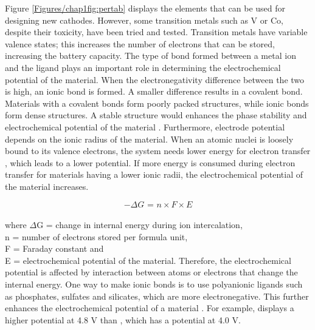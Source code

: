 Figure \ref{Figures/chap1fig:pertab} displays the elements that can be used for designing new cathodes. However, some transition metals such as V or Co, despite their toxicity, have been tried and tested. Transition metals have variable valence states; this increases the number of electrons that can be stored, increasing the battery capacity. The type of bond formed between a metal ion and the ligand plays an important role in determining the electrochemical potential of the material. When the electronegativity difference between the two is high, an ionic bond is formed. A smaller difference results in a covalent bond. Materials with a covalent bonds form poorly packed structures, while ionic bonds form dense structures. A stable structure would enhances the phase stability and electrochemical potential of the material \cite{melot_design_2013}. Furthermore, electrode potential depends on the ionic radius of the material. When an atomic nuclei is loosely bound to its valence electrons, the system needs lower energy for electron transfer , which leads to a lower potential. If more energy is consumed during electron transfer  for materials having a lower ionic radii, the electrochemical potential of the material increases. 

\begin{equation} \label{eq4}
    -\Delta G \text{ = } n \times F \times E
\end{equation}\\
where $\Delta$G = change in internal energy during ion intercalation,\\
n = number of electrons stored per formula unit,\\
F = Faraday constant and\\
E = electrochemical potential of the material. Therefore, the electrochemical potential is affected by interaction between atoms or electrons that change the internal energy. One way to make ionic bonds is to use polyanionic ligands such as phosphates, sulfates and silicates, which are more electronegative. This further enhances the electrochemical potential of a material \cite{melot_design_2013}. For example,  displays a higher potential at 4.8 V than  \cite{masquelier}, which has a potential at 4.0 V. 

